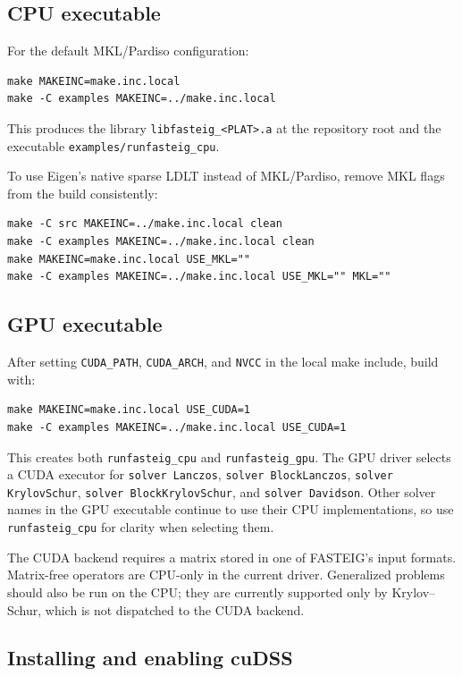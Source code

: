 \documentclass[11pt]{article}
\newcommand{\code}[1]{\texttt{#1}}
\begin{document}
\subsection{CPU executable}

For the default MKL/Pardiso configuration:

\begin{lstlisting}
make MAKEINC=make.inc.local
make -C examples MAKEINC=../make.inc.local
\end{lstlisting}

This produces the library \code{libfasteig\_<PLAT>.a} at the repository root
and the executable \code{examples/runfasteig\_cpu}.

To use Eigen's native sparse LDLT instead of MKL/Pardiso, remove MKL flags from
the build consistently:

\begin{lstlisting}
make -C src MAKEINC=../make.inc.local clean
make -C examples MAKEINC=../make.inc.local clean
make MAKEINC=make.inc.local USE_MKL=""
make -C examples MAKEINC=../make.inc.local USE_MKL="" MKL=""
\end{lstlisting}

\subsection{GPU executable}

After setting \code{CUDA\_PATH}, \code{CUDA\_ARCH}, and \code{NVCC} in the
local make include, build with:

\begin{lstlisting}
make MAKEINC=make.inc.local USE_CUDA=1
make -C examples MAKEINC=../make.inc.local USE_CUDA=1
\end{lstlisting}

This creates both \code{runfasteig\_cpu} and \code{runfasteig\_gpu}.  The GPU
driver selects a CUDA executor for \code{solver Lanczos},
\code{solver BlockLanczos}, \code{solver KrylovSchur},
\code{solver BlockKrylovSchur}, and \code{solver Davidson}.  Other solver names
in the GPU executable continue to use their CPU implementations, so use
\code{runfasteig\_cpu} for clarity when selecting them.

The CUDA backend requires a matrix stored in one of FASTEIG's input formats.
Matrix-free operators are CPU-only in the current driver.  Generalized
problems should also be run on the CPU; they are currently supported only by
Krylov--Schur, which is not dispatched to the CUDA backend.

\subsection{Installing and enabling cuDSS}
\label{sec:cudss}
\end{document}
